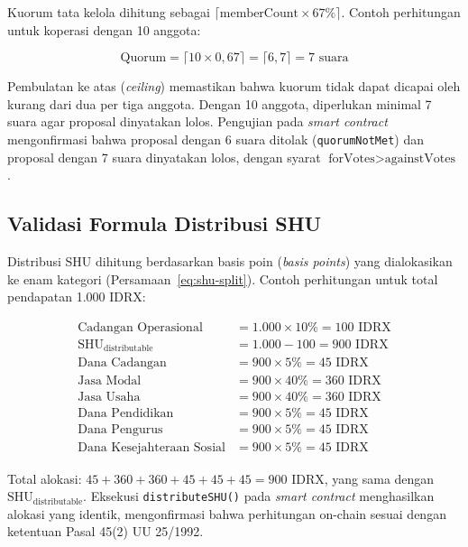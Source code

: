 Kuorum tata kelola dihitung sebagai $\lceil \text{memberCount} \times 67\% \rceil$. Contoh perhitungan untuk koperasi dengan 10 anggota:

\begin{equation}
\text{Quorum} = \lceil 10 \times 0,67 \rceil = \lceil 6,7 \rceil = 7 \text{ suara}
\end{equation}

Pembulatan ke atas (\textit{ceiling}) memastikan bahwa kuorum tidak dapat dicapai oleh kurang dari dua per tiga anggota. Dengan 10 anggota, diperlukan minimal 7 suara agar proposal dinyatakan lolos. Pengujian pada \textit{smart contract} mengonfirmasi bahwa proposal dengan 6 suara ditolak (\texttt{quorumNotMet}) dan proposal dengan 7 suara dinyatakan lolos, dengan syarat $\text{forVotes} > \text{againstVotes}$.

\subsection{Validasi Formula Distribusi SHU}

Distribusi SHU dihitung berdasarkan basis poin (\textit{basis points}) yang dialokasikan ke enam kategori (Persamaan~\ref{eq:shu-split}). Contoh perhitungan untuk total pendapatan 1.000 IDRX:

\begin{align}
\text{Cadangan Operasional} &= 1.000 \times 10\% = 100 \text{ IDRX} \nonumber \\
\text{SHU}_{\text{distributable}} &= 1.000 - 100 = 900 \text{ IDRX} \nonumber \\
\text{Dana Cadangan} &= 900 \times 5\% = 45 \text{ IDRX} \nonumber \\
\text{Jasa Modal} &= 900 \times 40\% = 360 \text{ IDRX} \nonumber \\
\text{Jasa Usaha} &= 900 \times 40\% = 360 \text{ IDRX} \nonumber \\
\text{Dana Pendidikan} &= 900 \times 5\% = 45 \text{ IDRX} \nonumber \\
\text{Dana Pengurus} &= 900 \times 5\% = 45 \text{ IDRX} \nonumber \\
\text{Dana Kesejahteraan Sosial} &= 900 \times 5\% = 45 \text{ IDRX} \nonumber
\end{align}

Total alokasi: $45 + 360 + 360 + 45 + 45 + 45 = 900$ IDRX, yang sama dengan $\text{SHU}_{\text{distributable}}$. Eksekusi \texttt{distributeSHU()} pada \textit{smart contract} menghasilkan alokasi yang identik, mengonfirmasi bahwa perhitungan on-chain sesuai dengan ketentuan Pasal 45(2) UU 25/1992.

